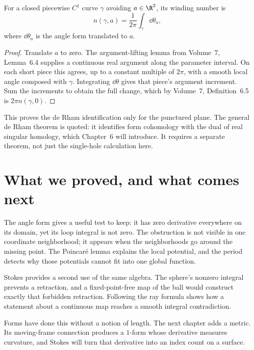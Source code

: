 \begin{corollary}\label{cor:windingintegral}
For a closed piecewise $C^1$ curve $\gamma$ avoiding $a\in\R^2$, its winding number is
\[
n(\gamma,a)=\frac1{2\pi}\int_\gamma\dd\theta_a,
\]
where $\dd\theta_a$ is the angle form translated to $a$.
\end{corollary}

\begin{proof}
Translate $a$ to zero. The argument-lifting lemma from Volume~7, Lemma~6.4 supplies a continuous real argument along the parameter interval. On each short piece this agrees, up to a constant multiple of $2\pi$, with a smooth local angle composed with $\gamma$. Integrating $\dd\theta$ gives that piece's argument increment. Sum the increments to obtain the full change, which by Volume~7, Definition~6.5 is $2\pi n(\gamma,0)$.
\end{proof}

\begin{remark}
This proves the de Rham identification only for the punctured plane. The general de Rham theorem is quoted: it identifies form cohomology with the dual of real singular homology, which Chapter~6 will introduce. It requires a separate theorem, not just the single-hole calculation here.
\end{remark}

\section{What we proved, and what comes next}

The angle form gives a useful test to keep: it has zero derivative everywhere on its domain, yet its loop integral is not zero. The obstruction is not visible in one coordinate neighborhood; it appears when the neighborhoods go around the missing point. The Poincar\'e lemma explains the local potential, and the period detects why those potentials cannot fit into one global function.

Stokes provides a second use of the same algebra. The sphere's nonzero integral prevents a retraction, and a fixed-point-free map of the ball would construct exactly that forbidden retraction. Following the ray formula shows how a statement about a continuous map reaches a smooth integral contradiction.

Forms have done this without a notion of length. The next chapter adds a metric. Its moving-frame connection produces a $1$-form whose derivative measures curvature, and Stokes will turn that derivative into an index count on a surface.

